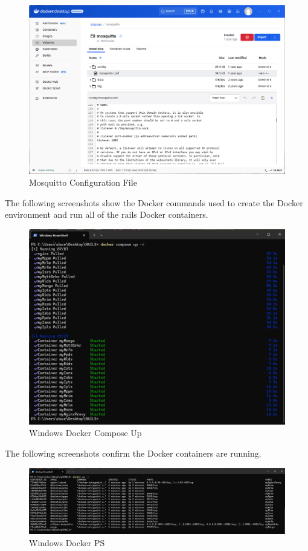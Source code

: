 \begin{figure}[H]
    \centering
    \includegraphics[scale=0.4]{../Images/edit-config-win.png}
    \caption{Mosquitto Configuration File}
    \label{fig:mosquitto-config}
\end{figure}
The following screenshots show the Docker commands used to create the Docker environment and run all of the \gls{rails} Docker containers.
\begin{figure}[H]
    \centering
    \includegraphics[scale=0.4]{../Images/dc-up-win.png}
    \caption{Windows Docker Compose Up}
    \label{fig:docker-compose-up} 
\end{figure}
The following screenshots confirm the Docker containers are running.
\begin{figure}[H]
    \centering
    \includegraphics[scale=0.37]{../Images/ps-win.png}
    \caption{Windows Docker PS}
    \label{fig:docker-cmds-2}
\end{figure}
